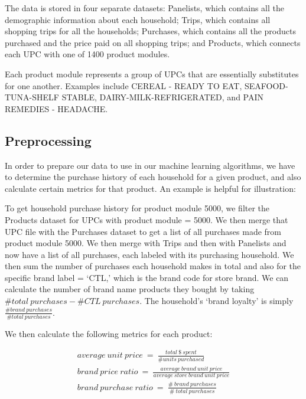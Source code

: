 \documentclass[conference]{IEEEtran}
\begin{document}
The data is stored in four separate datasets: Panelists, which contains all the demographic information about each household; Trips, which contains all shopping trips for all the households; Purchases, which contains all the products purchased and the price paid on all shopping trips; and Products, which connects each UPC with one of 1400 product modules.


Each product module represents a group of UPCs that are essentially substitutes for one another. Examples include CEREAL - READY TO EAT, SEAFOOD-TUNA-SHELF STABLE, DAIRY-MILK-REFRIGERATED, and PAIN REMEDIES - HEADACHE.

\subsection{Preprocessing}
In order to prepare our data to use in our machine learning algorithms, we have to determine the purchase history of each household for a given product, and also calculate certain metrics for that product. An example is helpful for illustration: 

To get household purchase history for product module 5000, we filter the Products dataset for UPCs with product module = 5000. We then merge that UPC file with the Purchases dataset to get a list of all purchases made from product module 5000. We then merge with Trips and then with Panelists and now have a list of all purchases, each labeled with its purchasing household. We then sum the number of purchases each household makes in total and also for the specific brand label = ‘CTL,’ which is the brand code for store brand. We can calculate the number of brand name products they bought by taking $\# total\ purchases-\# CTL\ purchases$. The household’s ‘brand loyalty’ is simply $\frac{\#brand\ purchases}{\#total\ purchases}$. 


We then calculate the following metrics for each product:

\begin{equation*}
\begin{aligned}
average\ unit\ price\ =\ \frac{total\ \$\ spent}{\#units\ purchased} \\
brand\ price\ ratio\ =\ \frac{average\ brand\ unit\ price}{average\ store\ brand\ unit\ price} \\
brand\ purchase\ ratio\ =\ \frac{\#\ brand\ purchases}{\#\ total\ purchases}
\end{aligned}
\end{equation*}
\end{document}
